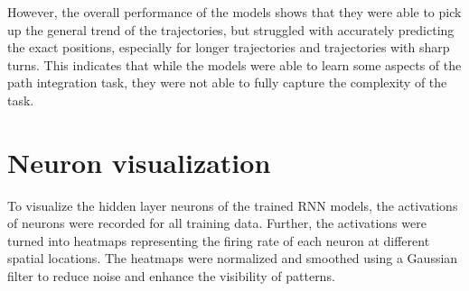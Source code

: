 \documentclass{article}
\begin{document}
However, the overall performance of the models shows that they were able to pick up the general trend of the trajectories, but struggled with accurately predicting the exact positions, especially for longer trajectories and trajectories with sharp turns. This indicates that while the models were able to learn some aspects of the path integration task, they were not able to fully capture the complexity of the task.


\section{Neuron visualization}
To visualize the hidden layer neurons of the trained RNN models, the activations of neurons were recorded for all training data. Further, the activations were turned into heatmaps representing the firing rate of each neuron at different spatial locations. The heatmaps were normalized and smoothed using a Gaussian filter to reduce noise and enhance the visibility of patterns. 
\end{document}

